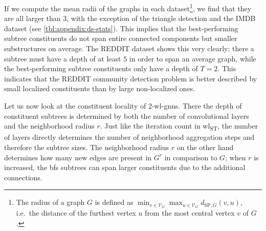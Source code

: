 If we compute the mean radii of the graphs in each dataset\footnote{
	The radius of a graph $G$ is defined as $\min_{v \in \mathcal{V}_G} \max_{u \in \mathcal{V}_G} d_{\mathrm{SP}, G}(v, u)$, i.e.\ the distance of the furthest vertex $u$ from the most central vertex $v$ of $G$.
}, we find that they are all larger than $3$, with the exception of the triangle detection and the IMDB dataset (see \cref{tbl:appendix:ds-stats}).
This implies that the best-performing subtree constituents do not span entire connected components but smaller substructures on average.
The REDDIT dataset shows this very clearly; there a subtree must have a depth of at least $5$ in order to span an average graph, while the best-performing subtree constituents only have a depth of $T = 2$.
This indicates that the REDDIT community detection problem is better described by small localized constituents than by large non-localized ones.

Let us now look at the constituent locality of 2-\acs{wl}-\acsp{gnn}.
There the depth of constituent subtrees is determined by both the number of convolutional layers and the neighborhood radius $r$.
Just like the iteration count in \acs{wl}\textsubscript{ST}, the number of layers directly determines the number of neighborhood aggregation steps and therefore the subtree sizes.
The neighborhood radius $r$ on the other hand determines how many new edges are present in $G^r$ in comparison to $G$;
when $r$ is increased, the \ac{bfs} subtrees can span larger constituents due to the additional connections.

